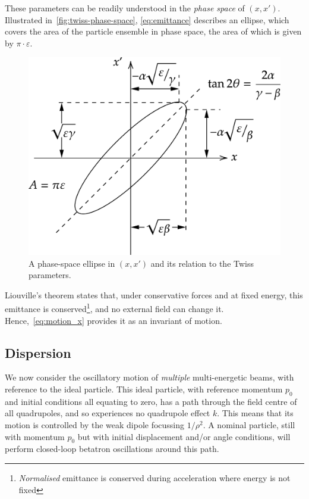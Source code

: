 \documentclass[a4paper,twoside,11pt]{report}
\begin{document}
These parameters can be readily understood in the \textit{phase space} of $(x, x')$. Illustrated in~\autoref{fig:twiss-phase-space}, \autoref{eq:emittance} describes an ellipse, which covers the area of the particle ensemble in phase space, the area of which is given by $\pi\cdot\varepsilon$. 

\begin{figure}[h]
  \centering
  \includegraphics*[width=0.6\linewidth]{phase-space-with-twiss.png}
  \caption{A phase-space ellipse in $(x, x')$ and its relation to the Twiss parameters.}
  \label{fig:twiss-phase-space}
\end{figure}

Liouville's theorem states that, under conservative forces and at fixed energy, this emittance is conserved\footnote{\textit{Normalised} emittance is conserved during acceleration where energy is not fixed}, and no external field can change it. Hence,~\autoref{eq:motion_x} provides it as an invariant of motion. 

\subsection{Dispersion}\label{sec:transdisp}

We now consider the oscillatory motion of \textit{multiple} multi-energetic beams, with reference to the ideal particle. This ideal particle, with reference momentum $p_0$ and initial conditions all equating to zero, has a path through the field centre of all quadrupoles, and so experiences no quadrupole effect $k$. This means that its motion is controlled by the weak dipole focussing $1/\rho^2$. A nominal particle, still with momentum $p_0$ but with initial displacement and/or angle conditions, will perform closed-loop betatron oscillations around this path. 
\end{document}
